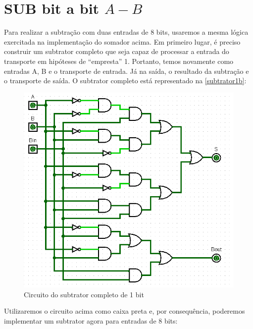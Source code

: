 \documentclass[
	12pt,				%
	openright,			%
	twoside,			%
	a4paper,			%
	english,			%
	french,				%
	spanish,			%
	brazil,				%
	]{abntex2}
\begin{document}
\section{SUB bit a bit \texorpdfstring{$A-B$}{Lg}}
Para realizar a subtração com duas entradas de 8 bits, usaremos a mesma lógica exercitada na implementação do somador acima. Em primeiro lugar, é preciso construir um subtrator completo que seja capaz de processar a entrada do transporte em hipóteses de “empresta” 1. Portanto, temos novamente como entradas A, B e o transporte de entrada. Já na saída, o resultado da subtração e o transporte de saída. O subtrator completo está representado na \autoref{subtrator1b}:

\begin{figure}[H]
	\begin{center}
	    \includegraphics[scale=0.4]{imagens/subtrator1b.png}
	\end{center}
\caption{\label{subtrator1b}Circuito do subtrator completo de 1 bit}
\end{figure}

Utilizaremos o circuito acima como caixa preta e, por consequência, poderemos implementar um subtrator agora para entradas de 8 bits:
\end{document}

